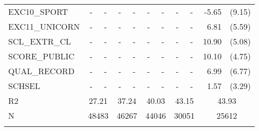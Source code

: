 \documentclass[10pt]{article}
\begin{document}
\begin{table}[htbp]
\begin{tabular}{lrlrlrlrlrl}
     	EXC10\_SPORT & \multicolumn{1}{c}{-} & \multicolumn{1}{c}{-} & \multicolumn{1}{c}{-} & \multicolumn{1}{c}{-} & \multicolumn{1}{c}{-} & \multicolumn{1}{c}{-} & \multicolumn{1}{c}{-} & \multicolumn{1}{c}{-} & -5.65 & (9.15) \\[0.2em]
     	EXC11\_UNICORN & \multicolumn{1}{c}{-} & \multicolumn{1}{c}{-} & \multicolumn{1}{c}{-} & \multicolumn{1}{c}{-} & \multicolumn{1}{c}{-} & \multicolumn{1}{c}{-} & \multicolumn{1}{c}{-} & \multicolumn{1}{c}{-} & 6.81  & (5.59) \\[0.2em]
     	SCL\_EXTR\_CL & \multicolumn{1}{c}{-} & \multicolumn{1}{c}{-} & \multicolumn{1}{c}{-} & \multicolumn{1}{c}{-} & \multicolumn{1}{c}{-} & \multicolumn{1}{c}{-} & \multicolumn{1}{c}{-} & \multicolumn{1}{c}{-} & 10.90 & (5.08) \\[0.2em]
     	SCORE\_PUBLIC & \multicolumn{1}{c}{-} & \multicolumn{1}{c}{-} & \multicolumn{1}{c}{-} & \multicolumn{1}{c}{-} & \multicolumn{1}{c}{-} & \multicolumn{1}{c}{-} & \multicolumn{1}{c}{-} & \multicolumn{1}{c}{-} & 10.10 & (4.75) \\[0.2em]
     	QUAL\_RECORD & \multicolumn{1}{c}{-} & \multicolumn{1}{c}{-} & \multicolumn{1}{c}{-} & \multicolumn{1}{c}{-} & \multicolumn{1}{c}{-} & \multicolumn{1}{c}{-} & \multicolumn{1}{c}{-} & \multicolumn{1}{c}{-} & 6.99  & (6.77) \\[0.2em]
     	SCHSEL & \multicolumn{1}{c}{-} & \multicolumn{1}{c}{-} & \multicolumn{1}{c}{-} & \multicolumn{1}{c}{-} & \multicolumn{1}{c}{-} & \multicolumn{1}{c}{-} & \multicolumn{1}{c}{-} & \multicolumn{1}{c}{-} & 1.57  & (3.29) \\[0.2em]
     	R2    & \multicolumn{2}{c}{27.21} & \multicolumn{2}{c}{37.24} & \multicolumn{2}{c}{40.03} & \multicolumn{2}{c}{43.15} & \multicolumn{2}{c}{43.93} \\[0.2em]
     	N     & \multicolumn{2}{c}{48483} & \multicolumn{2}{c}{46267} & \multicolumn{2}{c}{44046} & \multicolumn{2}{c}{30051} & \multicolumn{2}{c}{25612} \\[0.2em]
     	\bottomrule
        \\
    
    \end{tabular}%
  \label{tab:addlabel}%
\end{table}%
\end{document}
